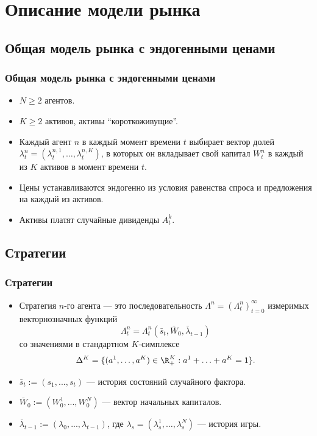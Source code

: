 \documentclass[aspectratio=169]{beamer}
\theoremstyle{definition}
\theoremstyle{remark}
\begin{document}
\section{Описание модели рынка}
\subsection{Общая модель рынка с эндогенными ценами}
\begin{frame}\frametitle{Общая модель рынка с эндогенными ценами} 
     \begin{itemize}
	\item $N \geq 2$ агентов.\\
    \item $K \geq 2$ активов, активы ``короткоживущие''.\\
    \item Каждый агент $n$ в каждый момент времени $t$ выбирает вектор долей $\lambda_t^n = (\lambda_{t}^{n,1},\ldots,\lambda_{t}^{n,K})$, в которых он вкладывает свой капитал $W_t^n$ в каждый из $K$ активов в момент времени $t$.\\
    \item Цены устанавливаются эндогенно из условия равенства спроса и предложения на каждый из активов.
    \item Активы платят случайные дивиденды $A_t^k$.
    \end{itemize}
\end{frame}

\subsection{Стратегии}
\begin{frame}\frametitle{Стратегии}
    \begin{itemize}
    \item Стратегия $n$-го агента — это последовательность $\Lambda^n =
    (\Lambda_t^n)_{t=0}^\infty$ измеримых векторнозначных функций 
    \[
    \Lambda_t^n =\Lambda_t^n(\bar s_{t},\bar W_0 , \bar \lambda_{t-1})
    \]
    со значениями в стандартном $K$-симплексе 
    \[
    \Delta^K
    =\{ (a^1, \dots, a^K) \in \R^K_+ : a^1+\ldots+a^K = 1\}.
    \]

    \item $\bar s_{t} := (s_1,...,s_{t})$ — история состояний случайного фактора.  
    \item $\bar W_0 := (W_0^1,...,W_0^N)$ — вектор начальных капиталов.
    \item $\bar \lambda_{t-1} := ( \lambda_0,..., \lambda_{t-1})$, где $ \lambda_s = (\lambda^1_s, \dots, \lambda^N_s )$ — история игры.
    \end{itemize}

\end{frame}
\end{document}
